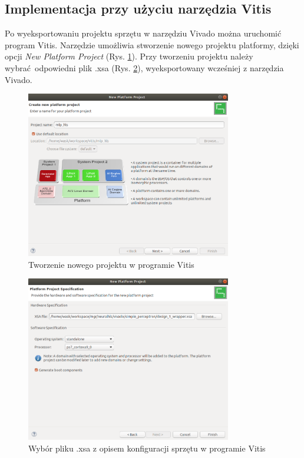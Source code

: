 \subsection{Implementacja przy użyciu narzędzia Vitis}

Po wyeksportowaniu projektu sprzętu w narzędziu Vivado można uruchomić program Vitis. Narzędzie umożliwia stworzenie 
nowego projektu platformy, dzięki opcji \emph{New Platform Project} (Rys. \ref{new-vitis-project1}). Przy tworzeniu 
projektu należy wybrać odpowiedni plik .xsa (Rys. \ref{new-vitis-project2}), wyeksportowany wcześniej z narzędzia 
Vivado. 

\begin{figure}
  \centering
  \includegraphics[width=0.8\textwidth]{img/new-vitis-project1.png}
  \caption{Tworzenie nowego projektu w programie Vitis}
  \label{new-vitis-project1}
\end{figure}


\begin{figure}
  \centering
  \includegraphics[width=0.8\textwidth]{img/new-vitis-project2.png}
  \caption{Wybór pliku .xsa z opisem konfiguracji sprzętu w programie Vitis}
  \label{new-vitis-project2}
\end{figure}

